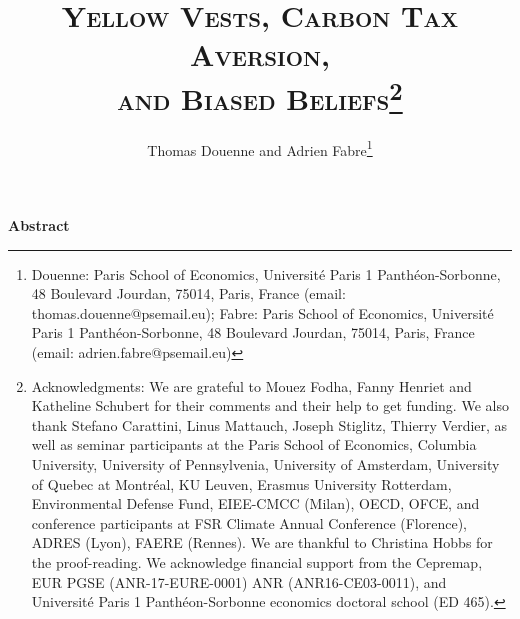 \documentclass[12pt]{article} %
\date{}
\title{\textsc{Yellow Vests, Carbon Tax Aversion, \\ and Biased Beliefs}\footnote{\scriptsize Acknowledgments: We are grateful to Mouez Fodha, Fanny Henriet and Katheline Schubert for their comments and their help to get funding. We also thank Stefano Carattini, Linus Mattauch, Joseph Stiglitz, Thierry Verdier, as well as seminar participants at the Paris School of Economics, Columbia University, University of Pennsylvenia, University of Amsterdam, University of Quebec at Montréal, KU Leuven, Erasmus University Rotterdam, Environmental Defense Fund, EIEE-CMCC (Milan), OECD, OFCE, and conference participants at FSR Climate Annual Conference (Florence), ADRES (Lyon), FAERE (Rennes). We are thankful to Christina Hobbs for the proof-reading. We acknowledge financial support from the Cepremap, EUR PGSE (ANR-17-EURE-0001) ANR (ANR16-CE03-0011), and Université Paris 1 Panthéon-Sorbonne economics doctoral school (ED 465).}} %
\author{Thomas Douenne and Adrien Fabre\footnote{\scriptsize Douenne: Paris School of Economics, Université Paris 1 Panthéon-Sorbonne, 48 Boulevard Jourdan, 75014, Paris, France (email: thomas.douenne@psemail.eu); Fabre: Paris School of Economics, Université Paris 1 Panthéon-Sorbonne, 48 Boulevard Jourdan, 75014, Paris, France (email: adrien.fabre@psemail.eu)}} %
\date{}
\providecommand{\DIFaddbegin}{} %
\providecommand{\DIFaddend}{} %
\newcommand{\DIFaddincludegraphics}[2][]{{\color{blue}\fbox{\DIFOincludegraphics[#1]{#2}}}} %
\DeclareRobustCommand{\DIFaddbegin}{\DIFOaddbegin \let\includegraphics\DIFaddincludegraphics} %
\DeclareRobustCommand{\DIFaddend}{\DIFOaddend \let\includegraphics\DIFOincludegraphics} %
\begin{document}
\maketitle

\DIFaddbegin 

\DIFaddend %

\vspace*{-0.2cm}\begin{center}
\textbf{Abstract} 
\end{center}
\end{document}
